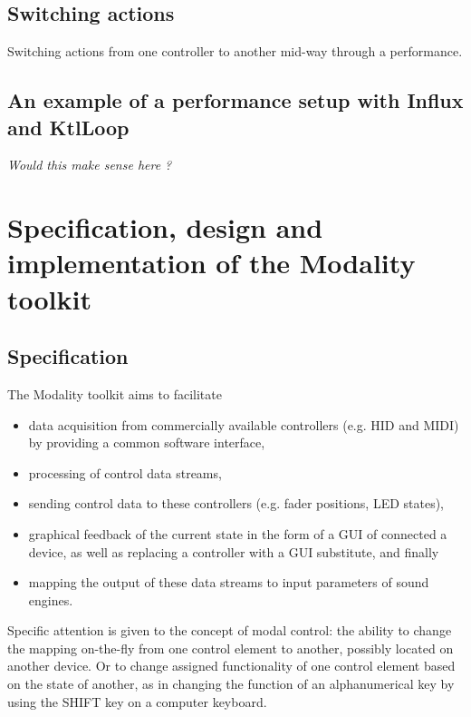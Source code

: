 \documentclass{article}
\begin{document}
\subsection{Switching actions}
\label{sub:switching_actions}

Switching actions from one controller to another mid-way through a performance.

\subsection{An example of a performance setup with Influx and KtlLoop}

\emph{Would this make sense here ?}



\section{Specification, design and implementation of the Modality toolkit}
\label{sec:implementation}

\subsection{Specification}
\label{sub:specification}

The Modality toolkit aims to facilitate
\begin{itemize}
	\item data acquisition from commercially available controllers (e.g. HID and MIDI) by providing a common software interface,
	\item processing of control data streams,
	\item sending control data to these controllers (e.g. fader positions, LED states),
	\item graphical feedback  of the current state in the form of a GUI of connected a device, as well as replacing a controller with a GUI substitute, and finally
	\item mapping the output of these data streams to input parameters of sound engines.
\end{itemize}

Specific attention is given to the concept of modal control: the ability to change the mapping on-the-fly from one control element to another, possibly located on another device.
Or to change assigned functionality of one control element based on the state of another, as in changing the function of an alphanumerical key by using the SHIFT key on a computer keyboard.
\end{document}
